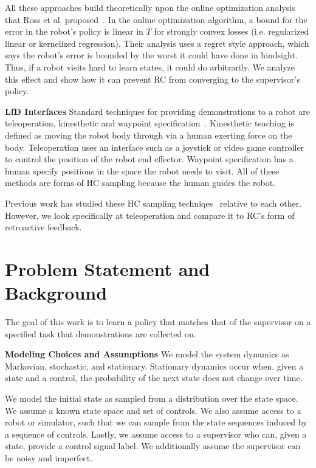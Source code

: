 \documentclass[10pt, conference]{ieeeconf}      %
\begin{document}
All these approaches build theoretically upon the online optimization analysis that Ross et al. proposed~\cite{ross2010reduction}. In the online optimization algorithm, a bound for the error in the robot's policy is linear in $T$ for strongly convex losses (i.e.  regularized linear or kernelized regression). Their analysis uses a regret style approach, which says the robot's error is bounded by the worst it could have done in hindsight. Thus, if a robot visits hard to learn states, it could do arbitrarily. We analyze this effect and show how it can prevent RC from converging to the supervisor's policy. 


\noindent \textbf{LfD Interfaces}
Standard techniques for providing demonstrations to a robot are teleoperation, kinesthetic and waypoint specification~\cite{akgun2012keyframe,akgun2012novel}. Kinesthetic teaching is defined as moving the robot body through via a human exerting force on the body. Teleoperation uses an interface such as a joystick or video game controller to control the position of the robot end effector. Waypoint specification has a human specify positions in the space the robot needs to visit. All of these methods are forms of HC sampling because the human guides the robot. 

Previous work has studied these HC sampling techniqes~\cite{akgun2012keyframe,akgun2012novel} relative to each other. However, we look specifically at teleoperation and compare it to RC's form of retroactive feedback. 

\section{Problem Statement and Background}\label{sec:PS}
The goal of this work is to learn a policy that matches that of the supervisor on a specified task that demonstrations are collected on. 

\noindent\textbf{Modeling Choices and Assumptions}  We model the system dynamics as Markovian, stochastic, and stationary. Stationary dynamics occur when, given a state and a control, the probability of the next state does not change over time. 

We model the initial state as sampled from a distribution over the state space.
We assume a known state space and set of controls. We also assume access to a robot or simulator, such that we  can sample from the state sequences induced by a sequence of controls.   Lastly, we assume access to a supervisor who can, given a state, provide a control signal label. We additionally assume the supervisor can be noisy and imperfect. 
\end{document}

